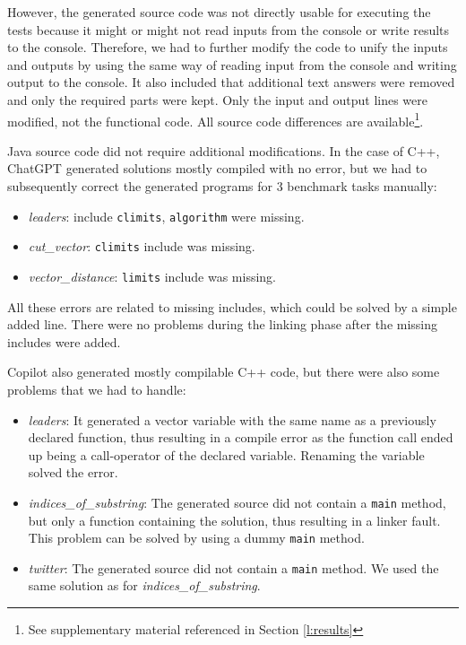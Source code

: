 However, the generated source code was not directly usable for executing the tests because it might or might not read inputs from the console or write results to the console.
Therefore, we had to further modify the code to unify the inputs and outputs by using the same way of reading input from the console and writing output to the console.
It also included that additional text answers were removed and only the required parts were kept.
Only the input and output lines were modified, not the functional code.
All source code differences are available\footnote{See supplementary material referenced in Section \ref{l:results}}.

Java source code did not require additional modifications.
In the case of C++, ChatGPT generated solutions mostly compiled with no error, but we had to subsequently correct the generated programs for 3 benchmark tasks manually:
\begin{itemize}
	\item \textit{leaders}: include \texttt{climits}, \texttt{algorithm} were missing.
	\item \textit{cut\_vector}: \texttt{climits} include was missing.
	\item \textit{vector\_distance}: \texttt{limits} include was missing.
\end{itemize}
All these errors are related to missing includes, which could be solved by a simple added line.
There were no problems during the linking phase after the missing includes were added.

Copilot also generated mostly compilable C++ code, but there were also some problems that we had to handle:
\begin{itemize}
	\item \textit{leaders}: It generated a vector variable with the same name as a previously declared function, thus resulting in a compile error as the function call ended up being a call-operator of the declared variable. Renaming the variable solved the error.
	\item \textit{indices\_of\_substring}: The generated source did not contain a \texttt{main} method, but only a function containing the solution, thus resulting in a linker fault. This problem can be solved by using a dummy \texttt{main} method.
	\item \textit{twitter}: The generated source did not contain a \texttt{main} method. We used the same solution as for \textit{indices\_of\_substring}.
\end{itemize}

